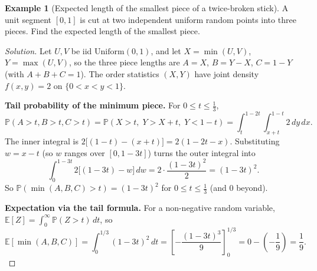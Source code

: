 \documentclass[11pt]{article}
\theoremstyle{definition}
\newtheorem{example}{Example}[section]
\newcommand{\E}{\mathbb{E}}
\begin{document}
\begin{example}[Expected length of the smallest piece of a twice-broken stick]
A unit segment $[0,1]$ is cut at two independent uniform random points into three pieces. Find the expected length of the smallest piece.
\end{example}
\begin{proof}[Solution]
Let $U,V$ be iid $\mathrm{Uniform}(0,1)$, and let $X=\min(U,V)$, $Y=\max(U,V)$, so the three piece lengths are $A=X$, $B=Y-X$, $C=1-Y$ (with $A+B+C=1$). The order statistics $(X,Y)$ have joint density $f(x,y)=2$ on $\{0<x<y<1\}$.

\textbf{Tail probability of the minimum piece.} For $0\le t\le\tfrac13$,
\[
\mathbb P(A>t,B>t,C>t)=\mathbb P(X>t,\;Y>X+t,\;Y<1-t)=\int_{t}^{1-2t}\int_{x+t}^{1-t}2\,dy\,dx.
\]
The inner integral is $2\bigl[(1-t)-(x+t)\bigr]=2(1-2t-x)$. Substituting $w=x-t$ (so $w$ ranges over $[0,1-3t]$) turns the outer integral into
\[
\int_0^{1-3t}2\bigl[(1-3t)-w\bigr]\,dw=2\cdot\frac{(1-3t)^2}{2}=(1-3t)^2.
\]
So $\mathbb P(\min(A,B,C)>t)=(1-3t)^2$ for $0\le t\le\tfrac13$ (and $0$ beyond).

\textbf{Expectation via the tail formula.} For a non-negative random variable, $\E[Z]=\int_0^\infty\mathbb P(Z>t)\,dt$, so
\[
\E[\min(A,B,C)]=\int_0^{1/3}(1-3t)^2\,dt=\left[-\frac{(1-3t)^3}{9}\right]_0^{1/3}=0-\left(-\frac19\right)=\boxed{\frac19}.
\]
\end{proof}
\end{document}
